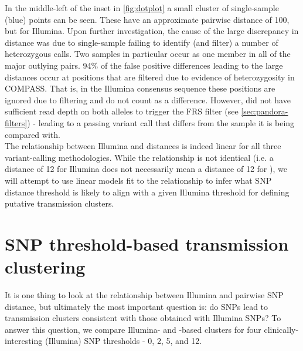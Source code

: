 In the middle-left of the inset in \autoref{fig:dotplot} a small cluster of \pandora{} single-sample (blue) points can be seen. These have an approximate pairwise \ont{} distance of 100, but  for Illumina. Upon further investigation, the cause of the large discrepancy in distance was due to \pandora{} single-sample failing to identify (and filter) a number of heterozygous calls. Two samples in particular occur as one member in all of the major outlying pairs. 94\% of the false positive differences leading to the large \ont{} distances occur at positions that are filtered due to evidence of heterozygosity in COMPASS. That is, in the Illumina consensus sequence these positions are ignored due to filtering and do not count as a difference. However, \pandora{} did not have sufficient read depth on both alleles to trigger the FRS filter (see \autoref{sec:pandora-filters}) - leading to a passing variant call that differs from the sample it is being compared with. \\

\noindent
The relationship between Illumina and \ont{} distances is indeed linear for all three variant-calling methodologies. While the relationship is not identical (i.e. a distance of 12 for Illumina does not necessarily mean a distance of 12 for \ont{}), we will attempt to use linear models fit to the relationship to infer what \ont{} SNP distance threshold is likely to align with a given Illumina threshold for defining putative transmission clusters.


\section{SNP threshold-based \ont{} transmission clustering}
\label{sec:clustering}

It is one thing to look at the relationship between Illumina and \ont{} pairwise SNP distance, but ultimately the most important question is: do \ont{} SNPs lead to transmission clusters consistent with those obtained with Illumina SNPs? To answer this question, we compare Illumina- and \ont{}-based clusters for four clinically-interesting (Illumina) SNP thresholds - 0, 2, 5, and 12. 

